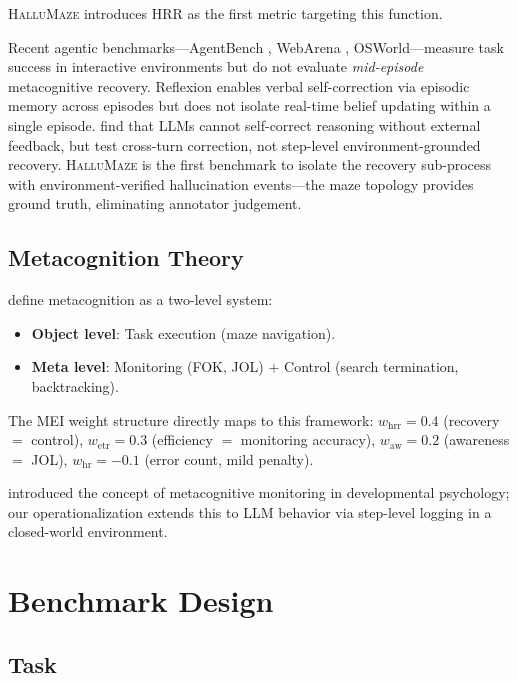 \documentclass{article}
\begin{document}
\textsc{HalluMaze} introduces HRR as the first metric targeting this function.

Recent agentic benchmarks---AgentBench \citep{liu2023agentbench}, WebArena \citep{zhou2023webarena}, OSWorld---measure task success in interactive environments but do not evaluate \emph{mid-episode} metacognitive recovery.
Reflexion \citep{shinn2023reflexion} enables verbal self-correction via episodic memory across episodes but does not isolate real-time belief updating within a single episode.
\citet{huang2024selfcorrect} find that LLMs cannot self-correct reasoning without external feedback, but test cross-turn correction, not step-level environment-grounded recovery.
\textsc{HalluMaze} is the first benchmark to isolate the recovery sub-process with environment-verified hallucination events---the maze topology provides ground truth, eliminating annotator judgement.

\subsection{Metacognition Theory}

\citet{nelson1990metamemory} define metacognition as a two-level system:
\begin{itemize}[nosep]
  \item \textbf{Object level}: Task execution (maze navigation).
  \item \textbf{Meta level}: Monitoring (FOK, JOL) $+$ Control (search termination, backtracking).
\end{itemize}

The MEI weight structure directly maps to this framework:
$w_{\text{hrr}}{=}0.4$ (recovery $=$ control), $w_{\text{etr}}{=}0.3$ (efficiency $=$ monitoring accuracy), $w_{\text{aw}}{=}0.2$ (awareness $=$ JOL), $w_{\text{hr}}{=}{-}0.1$ (error count, mild penalty).

\citet{flavell1979metacognition} introduced the concept of metacognitive monitoring in developmental psychology; our operationalization extends this to LLM behavior via step-level logging in a closed-world environment.

\section{Benchmark Design}

\subsection{Task}
\end{document}
